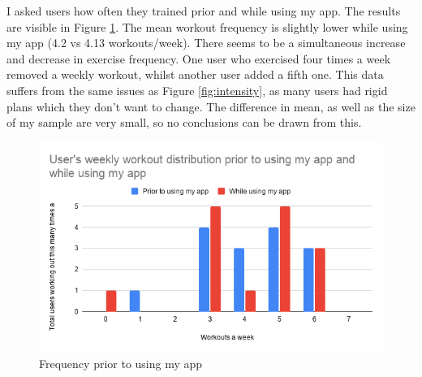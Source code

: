 \documentclass{l4proj}
\begin{document}
I asked users how often they trained prior and while using my app. The results are visible in Figure \ref{fig:workout_frequencies}. The mean workout frequency is slightly lower while using my app (4.2 vs 4.13 workouts/week). There seems to be a simultaneous increase and decrease in exercise frequency. One user who exercised four times a week removed a weekly workout, whilst another user added a fifth one. This data suffers from the same issues as Figure \ref{fig:intensity}, as many users had rigid plans which they don't want to change. The difference in mean, as well as the size of my sample are very small, so no conclusions can be drawn from this.
\begin{figure}[H]
    \centering
    \includegraphics[width=1.0\linewidth]{user_workout_distribution.png}    
    \caption{Frequency prior to using my app}
    \label{fig:workout_frequencies} 
\end{figure}
\end{document}
